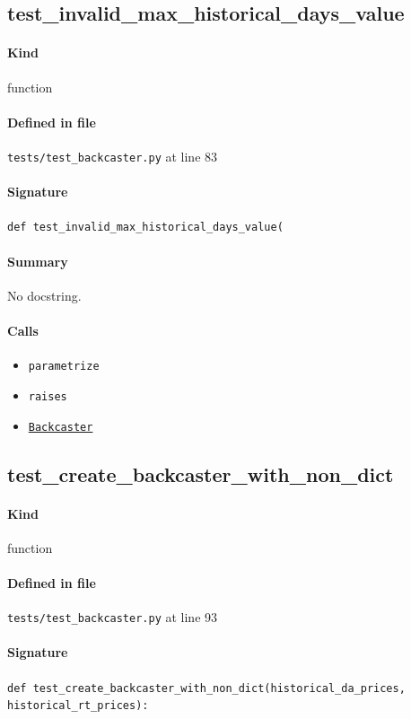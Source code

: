 \documentclass[11pt]{report}
\begin{document}
\subsection{test\_invalid\_max\_historical\_days\_value}
\label{def:tests-test_backcaster.py:test_invalid_max_historical_days_value:L83}
\paragraph{Kind} function
\paragraph{Defined in file} \texttt{tests/test\_backcaster.py} at line 83
\paragraph{Signature} \texttt{def test\_invalid\_max\_historical\_days\_value(}
\paragraph{Summary} No docstring.
\paragraph{Calls}
\begin{itemize}[leftmargin=*]
  \item \texttt{parametrize}
  \item \texttt{raises}
  \item \hyperref[def:forecaster.py:Backcaster:L321]{\texttt{Backcaster}}
\end{itemize}
\subsection{test\_create\_backcaster\_with\_non\_dict}
\label{def:tests-test_backcaster.py:test_create_backcaster_with_non_dict:L93}
\paragraph{Kind} function
\paragraph{Defined in file} \texttt{tests/test\_backcaster.py} at line 93
\paragraph{Signature} \texttt{def test\_create\_backcaster\_with\_non\_dict(historical\_da\_prices, historical\_rt\_prices):}
\end{document}
